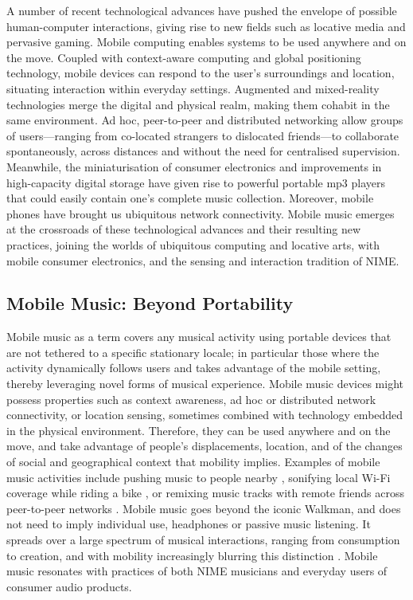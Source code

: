 A number of recent technological
advances have pushed the envelope of possible human-computer interactions, giving
rise to new fields such as locative media and pervasive gaming. Mobile computing
enables systems to be used anywhere and on the move. Coupled with context-aware
computing and global positioning technology, mobile devices can respond to the
user's surroundings and location, situating interaction within everyday settings.
Augmented and mixed-reality technologies merge the digital and physical realm,
making them cohabit in the same environment. Ad hoc, peer-to-peer and distributed
networking allow groups of users---ranging from co-located strangers to
dislocated friends---to collaborate spontaneously, across distances and without
the need for centralised supervision. Meanwhile, the miniaturisation of consumer
electronics and improvements in high-capacity digital storage have given rise to
powerful portable mp3 players that could easily contain one's complete music
collection. Moreover, mobile phones have brought us ubiquitous network
connectivity. Mobile music emerges at the crossroads of these technological
advances and their resulting new practices, joining the worlds of ubiquitous
computing and locative arts, with mobile consumer electronics, and the sensing
and interaction tradition of NIME.

\subsection{Mobile Music: Beyond Portability}

Mobile music as a term covers any musical activity using portable devices that
are not tethered to a specific stationary locale; in particular those where the
activity dynamically follows users and takes advantage of the mobile setting,
thereby leveraging novel forms of musical experience. Mobile music devices might
possess properties such as context awareness, ad hoc or distributed network
connectivity, or location sensing, sometimes combined with technology embedded in
the physical environment. Therefore, they can be used anywhere and on the move,
and take advantage of people's displacements, location, and of the changes of
social and geographical context that mobility implies. Examples of mobile music
activities include pushing music to people nearby \cite{Jacobsson:2005}, sonifying local Wi-Fi
coverage while riding a bike \cite{McCallum:2005}, or remixing music tracks with remote friends
across peer-to-peer networks \cite{Tanaka:2005}. Mobile music goes beyond the iconic
Walkman\texttrademark{}, and does not need to imply individual use, headphones or
passive music listening. It spreads over a large spectrum of musical
interactions, ranging from consumption to creation, and with mobility
increasingly blurring this distinction \cite{DArcangelo:2005}. Mobile music resonates with
practices of both NIME musicians and everyday users of consumer audio products.

